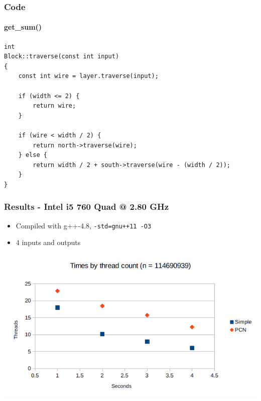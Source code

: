 \documentclass[notes=show]{beamer}
\begin{document}
\begin{frame}[fragile]
\frametitle{Code}
\framesubtitle{get\_sum()}
\begin{lstlisting}
int
Block::traverse(const int input)
{
    const int wire = layer.traverse(input);

    if (width <= 2) {
        return wire;
    }

    if (wire < width / 2) {
        return north->traverse(wire);
    } else {
        return width / 2 + south->traverse(wire - (width / 2));
    }
}
\end{lstlisting}
\end{frame}

\begin{frame}
\frametitle{Results - Intel i5 760 Quad @ 2.80 GHz}

\begin{itemize}
\item Compiled with g++-4.8, \lstinline|-std=gnu++11 -O3|
\item 4 inputs and outputs
\end{itemize}

\includegraphics[width=\textwidth]{core_i5}
\end{frame}
\end{document}
